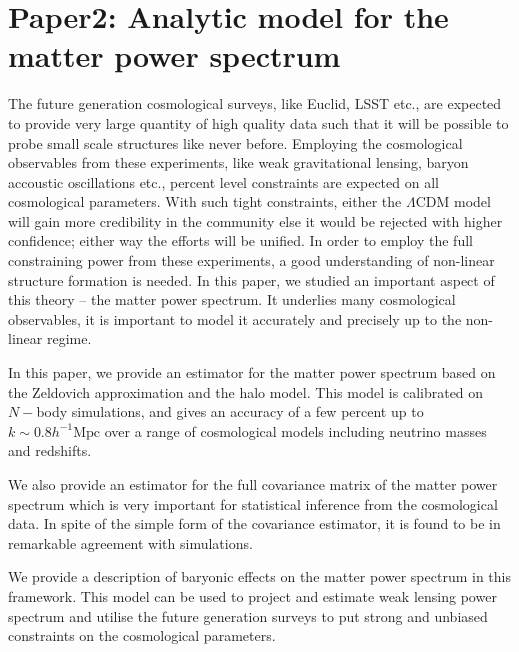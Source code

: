 \chapter{Paper2: Analytic model for the matter power spectrum}\label{paper:analyticmodel}

The future generation cosmological surveys, like Euclid, 
LSST etc., are expected to provide
very large quantity of high quality data such that it will be 
possible to probe small scale structures like never before. Employing 
the cosmological observables from these experiments,
like weak gravitational lensing, baryon accoustic oscillations etc., 
percent level constraints are expected on all cosmological 
parameters. With such tight
constraints, either the $\Lambda$CDM model will gain more credibility
in the community else it would be rejected with higher confidence; either 
way the efforts will be unified. 
In order to employ the full constraining power from these experiments, a good
understanding of non-linear structure formation is needed.
In this paper, we studied an important aspect of this theory -- 
the matter power spectrum. It underlies
many cosmological observables, it is important
to model it accurately and precisely up to the non-linear regime. 

In this paper, we provide an estimator for the matter
power spectrum based on the Zeldovich approximation and the halo model. 
This model is calibrated on $N-$body simulations, and gives
an accuracy of a few percent up to $k\sim 0.8 h^{-1}\mathrm{Mpc}$ 
over a range of cosmological models 
including neutrino masses and redshifts. 

We also provide an estimator for the full covariance matrix of the matter power
spectrum which is very important for statistical inference from the cosmological
data. In spite of the simple form of the covariance estimator, it is found
to be in remarkable agreement with simulations. 

We provide a description of baryonic effects on the matter
power spectrum in this framework. This model can be used to project and estimate
weak lensing power spectrum and utilise the future generation surveys
to put strong and unbiased constraints on the cosmological parameters.


